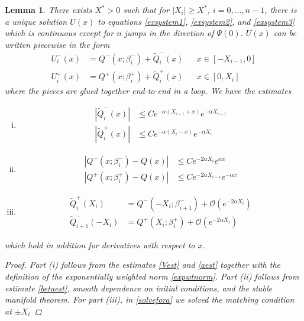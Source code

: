 \documentclass[10pt,reqno]{amsart}
\theoremstyle{plain}
\newtheorem{lemma}[theorem]{Lemma}
\theoremstyle{definition}
\theoremstyle{remark}
\numberwithin{theorem}{section}
\numberwithin{equation}{section}
\begin{document}

\begin{lemma}\label{solvewithjumps}
There exists $X^* > 0$ such that for $|X_i| \geq X^*$, $i = 0, \dots, n-1$, there is a unique solution $U(x)$ to equations \eqref{exsystem1}, \eqref{exsystem2}, and \eqref{exsystem3} which is continuous except for $n$ jumps in the direction of $\Psi(0)$. $U(x)$ can be written piecewise in the form 
\begin{equation}\label{Upiecewise2}
\begin{aligned}
U_i^-(x) &= Q^-(x; \beta_i^-) + \tilde{Q}_i^-(x) && x \in [-X_{i-1}, 0] \\
U_i^+(x) &= Q^+(x; \beta_i^+) + \tilde{Q}_i^+(x) && x \in [0, X_i]
\end{aligned}
\end{equation}
where the pieces are glued together end-to-end in a loop. We have the estimates
\begin{enumerate}[(i)]
\item
\begin{equation}\label{tildeQbounds}
\begin{aligned}
|\tilde{Q}_i^-(x)| &\leq C e^{-\alpha(X_{i-1} + x)}e^{-\alpha X_{i-1}} \\
|\tilde{Q}_i^+(x)| &\leq C e^{-\alpha(X_i - x)}e^{-\alpha X_i} 
\end{aligned}
\end{equation}
\item 
\begin{equation}
\begin{aligned}\label{Qpmbounds}
|Q^-(x; \beta_i^-) - Q(x)| &\leq C e^{-2 \alpha X_i} e^{\alpha x} \\
|Q^+(x; \beta_i^+) - Q(x)| &\leq C e^{-2 \alpha X_{i-1}} e^{-\alpha x}
\end{aligned}
\end{equation}
\item
\begin{equation}\label{VQpm}
\begin{aligned}
\tilde{Q}_i^+(X_i) &= Q^-(-X_i; \beta_{i+1}^-) + \mathcal{O}(e^{-2 \alpha X_i}) \\
\tilde{Q}_{i+1}^-(-X_i) &= Q^+(X_i; \beta_i^+) + \mathcal{O}(e^{-2 \alpha X_i})
\end{aligned}
\end{equation}
\end{enumerate}
which hold in addition for derivatives with respect to $x$.
\begin{proof}
Part (i) follows from the estimates \cref{Vest} and \cref{aest} together with the definition of the exponentially weighted norm \cref{expwtnorm}. Part (ii) follows from estimate \eqref{betaest}, smooth dependence on initial conditions, and the stable manifold theorem. For part (iii), in \cref{solvefora} we solved the matching condition at $\pm X_i$

\end{proof}
\end{lemma}
\end{document}
